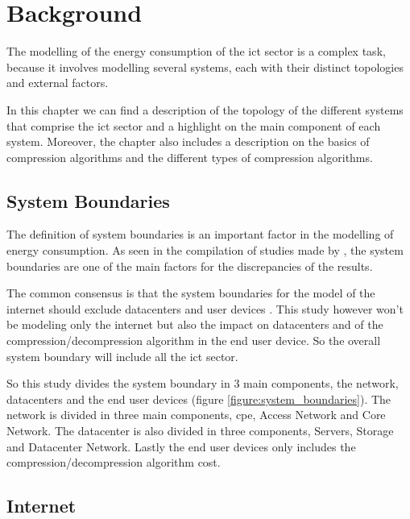

\chapter{Background}
\label{chapter:background}

\begin{introduction}
    
    The modelling of the energy consumption of the \ac{ict} sector is a complex task, because it involves modelling several systems, each with their distinct topologies and external factors.

    In this chapter we can find a description of the topology of the different systems that comprise the \ac{ict} sector and a highlight on the main component of each system. Moreover, the chapter also includes a description on the basics of compression algorithms and the different types of compression algorithms.

\end{introduction}

\section{System Boundaries}
\label{section:system_boundaries}

The definition of system boundaries is an important factor in the modelling of energy consumption. As seen in the compilation of studies made by \citet{Aslan2018}, the system boundaries are one of the main factors for the discrepancies of the results.

The common consensus is that the system boundaries for the model of the internet should exclude datacenters and user devices \citet{Coroama2014}. This study however won't be modeling only the internet but also the impact on datacenters and of the compression/decompression algorithm in the end user device. So the overall system boundary will include all the \ac{ict} sector. 

So this study divides the system boundary in 3 main components, the network, datacenters and the end user devices (figure \ref{figure:system_boundaries}). The network is divided in three main components, \ac{cpe}, Access Network and Core Network. The datacenter is also divided in three components, Servers, Storage and Datacenter Network. Lastly the end user devices only includes the compression/decompression algorithm cost. 

\section{Internet}

